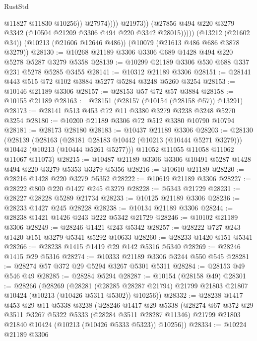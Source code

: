 \begin{lexlean}{RustStd}
\begin{coremodule}
                          @11827
                          @11830
                          @10256))
                      @27974))))
              @21973))
          (@27856 @494 @220 @3279 @3342 (@10504 @21209 @3306 @494 @220 @3342 @28015)))))
    (@13212 (@21602 @34))
    (@10213 (@21606 @12646 @486))
    (@10079 (@21613 @486 @686 @3878 @3279))
@28130 := @10268 @21189 @3306 @3306 @689 @1428 @494 @220 @5278 @5287 @3279 @5358
@28139 := @10299 @21189 @3306 @530 @688 @337 @231 @5278 @5285 @3455
@28141 := @10312 @21189 @3306
@28151 := @28141 @443 @515 @72 @102 @3884 @5277 @5284 @3248 @5260 @3254
@28153 := @10146 @21189 @3306
@28157 := @28153 @57 @72 @57 @3884
@28158 := @10155 @21189
@28163 := @28151 (@28157 (@10154 (@28158 @57)) @13291)
@28173 := @28141 @513 @453 @72 @11 @3380 @3279 @3238 @3248 @5270 @3254
@28180 := @10200 @21189 @3306 @72 @512 @3380 @10790 @10794
@28181 := @28173 @28180
@28183 := @10437 @21189 @3306
@28203 := @28130
    (@28139
      (@28163
        (@28181 @28183 @10442 (@10213 (@10444 @5271 @3279)))
        @10442
        (@10213 (@10444 @5261 @5277)))
      @11052
      @11055
      @11058
      @11062
      @11067
      @11073)
@28215 := @10487 @21189 @3306 @3306 @10491 @5287 @1428 @494 @220 @3279 @5353 @3279 @5356
@28216 := @10610 @21189
@28220 := @28216 @1428 @220 @3279 @5352
@28222 := @10619 @21189 @3306
@28227 := @28222 @800 @220 @1427 @245 @3279
@28228 := @5343 @21729
@28231 := @28227 @28228 @5289 @21734
@28233 := @10125 @21189 @3306
@28236 := @28233 @1427 @245 @28228
@28238 := @10134 @21189 @3306
@28244 := @28238 @1421 @1426 @243 @222 @5342 @21729
@28246 := @10102 @21189 @3306
@28249 := @28246 @1421 @243 @5342
@28257 := @28222 @727 @243 @1420 @151 @3279 @5341 @5292 @10633
@28260 := @28233 @1420 @151 @5341
@28266 := @28238 @1415 @1419 @29 @142 @5316 @5340
@28269 := @28246 @1415 @29 @5316
@28274 := @10333 @21189 @3306 @3244 @550 @545
@28281 := @28274 @57 @372 @29 @5294 @3267 @5301 @5311
@28284 := @28153 @49 @546 @49
@28285 := @28284 @5294
@28287 := @10154 (@28158 @49)
@28301 := @28266
    (@28269
      (@28281
        (@28285 @28287 @21794)
        @21799
        @21803
        @21807
        @10424
        (@10213 (@10426 @5311 @5302))
        @10256))
@28332 := @28238
    @1417
    @453
    @29
    @11
    @5338
    @3238
    (@28246
      @1417
      @29
      @5338
      (@28274
        @67
        @372
        @29
        @3511
        @3267
        @5322
        @5333
        (@28284 @3511 @28287 @11346)
        @21799
        @21803
        @21840
        @10424
        (@10213 (@10426 @5333 @5323))
        @10256))
@28334 := @10224 @21189 @3306

\end{coremodule}
\end{lexlean}
